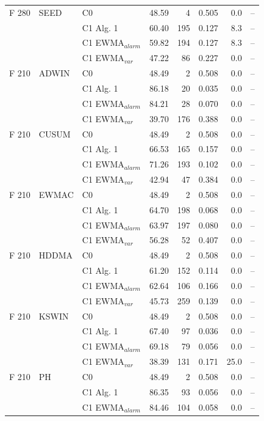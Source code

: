 \begin{longtable}{lllrrrrr}
\hline
F  280 & SEED & C0 & 48.59 & 4 & 0.505 & 0.0 & -- \\
 &  & C1 Alg. 1 & 60.40 & 195 & 0.127 & 8.3 & -- \\
 &  & C1 EWMA$_{alarm}$ & 59.82 & 194 & 0.127 & 8.3 & -- \\
 &  & C1 EWMA$_{var}$ & 47.22 & 86 & 0.227 & 0.0 & -- \\
\hline
F  210 & ADWIN & C0 & 48.49 & 2 & 0.508 & 0.0 & -- \\
 &  & C1 Alg. 1 & 86.18 & 20 & 0.035 & 0.0 & -- \\
 &  & C1 EWMA$_{alarm}$ & 84.21 & 28 & 0.070 & 0.0 & -- \\
 &  & C1 EWMA$_{var}$ & 39.70 & 176 & 0.388 & 0.0 & -- \\
\hline
F  210 & CUSUM & C0 & 48.49 & 2 & 0.508 & 0.0 & -- \\
 &  & C1 Alg. 1 & 66.53 & 165 & 0.157 & 0.0 & -- \\
 &  & C1 EWMA$_{alarm}$ & 71.26 & 193 & 0.102 & 0.0 & -- \\
 &  & C1 EWMA$_{var}$ & 42.94 & 47 & 0.384 & 0.0 & -- \\
\hline
F  210 & EWMAC & C0 & 48.49 & 2 & 0.508 & 0.0 & -- \\
 &  & C1 Alg. 1 & 64.70 & 198 & 0.068 & 0.0 & -- \\
 &  & C1 EWMA$_{alarm}$ & 63.97 & 197 & 0.080 & 0.0 & -- \\
 &  & C1 EWMA$_{var}$ & 56.28 & 52 & 0.407 & 0.0 & -- \\
\hline
F  210 & HDDMA & C0 & 48.49 & 2 & 0.508 & 0.0 & -- \\
 &  & C1 Alg. 1 & 61.20 & 152 & 0.114 & 0.0 & -- \\
 &  & C1 EWMA$_{alarm}$ & 62.64 & 106 & 0.166 & 0.0 & -- \\
 &  & C1 EWMA$_{var}$ & 45.73 & 259 & 0.139 & 0.0 & -- \\
\hline
F  210 & KSWIN & C0 & 48.49 & 2 & 0.508 & 0.0 & -- \\
 &  & C1 Alg. 1 & 67.40 & 97 & 0.036 & 0.0 & -- \\
 &  & C1 EWMA$_{alarm}$ & 69.18 & 79 & 0.056 & 0.0 & -- \\
 &  & C1 EWMA$_{var}$ & 38.39 & 131 & 0.171 & 25.0 & -- \\
\hline
F  210 & PH & C0 & 48.49 & 2 & 0.508 & 0.0 & -- \\
 &  & C1 Alg. 1 & 86.35 & 93 & 0.056 & 0.0 & -- \\
 &  & C1 EWMA$_{alarm}$ & 84.46 & 104 & 0.058 & 0.0 & -- \\

\end{longtable}
